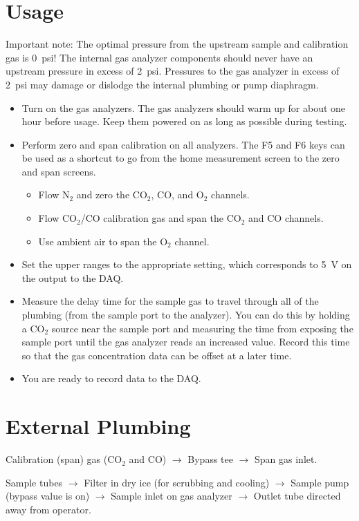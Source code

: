 \documentclass[11pt,oneside]{book}
\begin{document}
\section{Usage}

Important note: The optimal pressure from the upstream sample and calibration gas is 0~psi! The internal gas analyzer components should never have an upstream pressure in excess of 2~psi. Pressures to the gas analyzer in excess of 2~psi may damage or dislodge the internal plumbing or pump diaphragm.

\begin{itemize}
\item Turn on the gas analyzers. The gas analyzers should warm up for about one hour before usage. Keep them powered on as long as possible during testing.
\item Perform zero and span calibration on all analyzers. The F5 and F6 keys can be used as a shortcut to go from the home measurement screen to the zero and span screens.
    \begin{itemize}
    \item Flow N$_2$ and zero the CO$_2$, CO, and O$_2$ channels.
    \item Flow CO$_2$/CO calibration gas and span the CO$_2$ and CO channels.
    \item Use ambient air to span the O$_2$ channel.
    \end{itemize}
\item Set the upper ranges to the appropriate setting, which corresponds to 5~V on the output to the DAQ.
\item Measure the delay time for the sample gas to travel through all of the plumbing (from the sample port to the analyzer). You can do this by holding a CO$_2$ source near the sample port and measuring the time from exposing the sample port until the gas analyzer reads an increased value. Record this time so that the gas concentration data can be offset at a later time.
\item You are ready to record data to the DAQ.
\end{itemize}

\section{External Plumbing}

Calibration (span) gas (CO$_2$ and CO) $\rightarrow$ Bypass tee $\rightarrow$ Span gas inlet.

Sample tubes $\rightarrow$ Filter in dry ice (for scrubbing and cooling) $\rightarrow$ Sample pump (bypass value is on) $\rightarrow$ Sample inlet on gas analyzer $\rightarrow$ Outlet tube directed away from operator.
\end{document}
